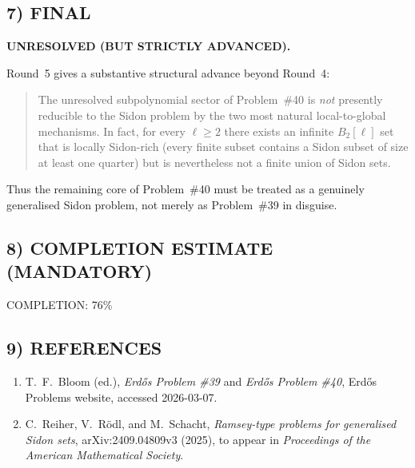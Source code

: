 \subsection*{7) FINAL}
\textbf{UNRESOLVED (BUT STRICTLY ADVANCED).}

Round~5 gives a substantive structural advance beyond Round~4:
\begin{quote}
The unresolved subpolynomial sector of Problem~\#40 is \emph{not} presently reducible to the
Sidon problem by the two most natural local-to-global mechanisms. In fact, for every
$\ell\ge 2$ there exists an infinite $B_2[\ell]$ set that is locally Sidon-rich (every finite subset
contains a Sidon subset of size at least one quarter) but is nevertheless not a finite union
of Sidon sets.
\end{quote}
Thus the remaining core of Problem~\#40 must be treated as a genuinely generalised Sidon
problem, not merely as Problem~\#39 in disguise.

\subsection*{8) COMPLETION ESTIMATE (MANDATORY)}
COMPLETION: 76\%

\subsection*{9) REFERENCES}
\begin{enumerate}
\item T.~F.~Bloom (ed.), \emph{Erd\H{o}s Problem \#39} and \emph{Erd\H{o}s Problem \#40},
Erd\H{o}s Problems website, accessed 2026-03-07.
\item C.~Reiher, V.~R\"odl, and M.~Schacht, \emph{Ramsey-type problems for generalised Sidon sets},
arXiv:2409.04809v3 (2025), to appear in \emph{Proceedings of the American Mathematical Society}.
\end{enumerate}
